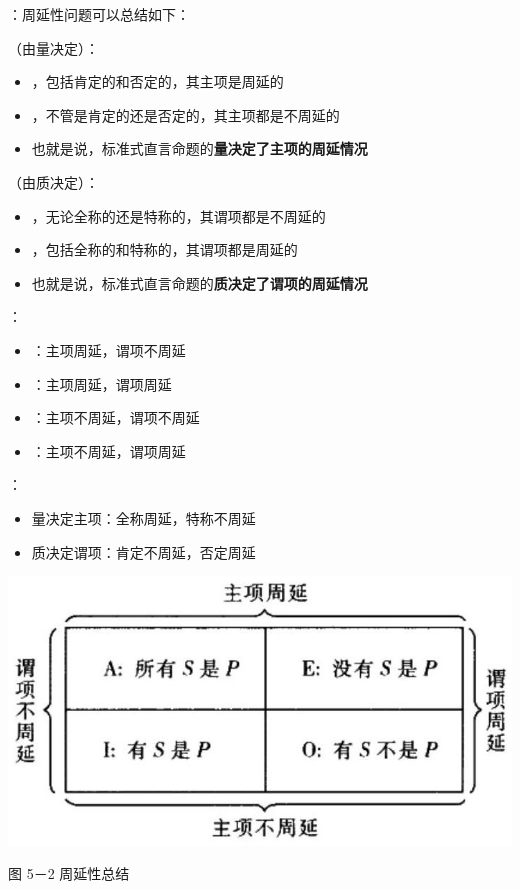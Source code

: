 \begin{theorembox}[title=周延性规律总结]
：周延性问题可以总结如下：

（由量决定）：
\begin{itemize}
  \item {}，包括肯定的和否定的，其主项是周延的
  \item {}，不管是肯定的还是否定的，其主项都是不周延的
  \item 也就是说，标准式直言命题的\textbf{量决定了主项的周延情况}
\end{itemize}

（由质决定）：
\begin{itemize}
  \item {}，无论全称的还是特称的，其谓项都是不周延的
  \item {}，包括全称的和特称的，其谓项都是周延的
  \item 也就是说，标准式直言命题的\textbf{质决定了谓项的周延情况}
\end{itemize}

：
\begin{itemize}
  \item {}：主项周延，谓项不周延
  \item {}：主项周延，谓项周延
  \item {}：主项不周延，谓项不周延
  \item {}：主项不周延，谓项周延
\end{itemize}

：
\begin{itemize}
  \item 量决定主项：全称周延，特称不周延
  \item 质决定谓项：肯定不周延，否定周延
\end{itemize}
\end{theorembox}

\begin{center}
\includegraphics[width=\textwidth]{images/2025_05_15_6a28331d5e7c993ad07ag-234.jpg}

图 5－2 周延性总结
\end{center}

